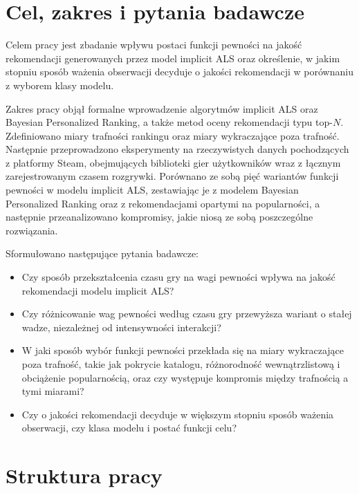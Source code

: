 \section{Cel, zakres i pytania badawcze}

Celem pracy jest zbadanie wpływu postaci funkcji pewności na jakość rekomendacji generowanych przez model implicit ALS oraz określenie, w jakim stopniu sposób ważenia obserwacji decyduje o jakości rekomendacji w porównaniu z wyborem klasy modelu.

Zakres pracy objął formalne wprowadzenie algorytmów implicit ALS oraz Bayesian Personalized Ranking, a także metod oceny rekomendacji typu top-$N$. Zdefiniowano miary trafności rankingu oraz miary wykraczające poza trafność. Następnie przeprowadzono eksperymenty na rzeczywistych danych pochodzących z platformy Steam, obejmujących biblioteki gier użytkowników wraz z łącznym zarejestrowanym czasem rozgrywki. Porównano ze sobą pięć wariantów funkcji pewności w modelu implicit ALS, zestawiając je z modelem Bayesian Personalized Ranking oraz z rekomendacjami opartymi na popularności, a następnie przeanalizowano kompromisy, jakie niosą ze sobą poszczególne rozwiązania.

Sformułowano następujące pytania badawcze:

\begin{itemize}
    \item[\textbf{PB1.}] Czy sposób przekształcenia czasu gry na wagi pewności wpływa na jakość rekomendacji modelu implicit ALS?

    \item[\textbf{PB2.}] Czy różnicowanie wag pewności według czasu gry przewyższa wariant o stałej wadze, niezależnej od intensywności interakcji?

    \item[\textbf{PB3.}] W jaki sposób wybór funkcji pewności przekłada się na miary wykraczające poza trafność, takie jak pokrycie katalogu, różnorodność wewnątrzlistową i obciążenie popularnością, oraz czy występuje kompromis między trafnością a tymi miarami?

    \item[\textbf{PB4.}] Czy o jakości rekomendacji decyduje w większym stopniu sposób ważenia obserwacji, czy klasa modelu i postać funkcji celu?
\end{itemize}

\section{Struktura pracy}

